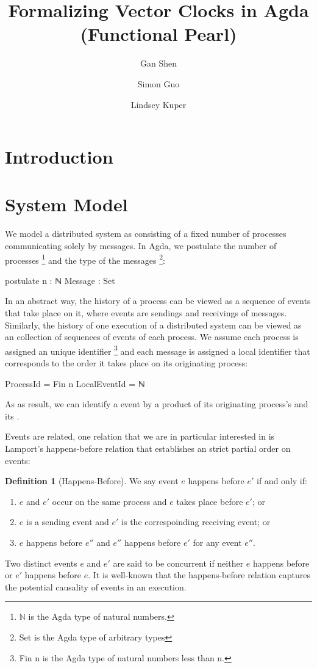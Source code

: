\documentclass[acmsmall,review,anonymous]{acmart}
\title{Formalizing Vector Clocks in Agda (Functional Pearl)}
\author{Gan Shen}
\affiliation{\institution{University of California, Santa Cruz} \country{USA}}
\author{Simon Guo}
\affiliation{\institution{University of California, Santa Cruz} \country{USA}}
\author{Lindsey Kuper}
\affiliation{\institution{University of California, Santa Cruz} \country{USA}}
\theoremstyle{definition}
\newtheorem{definition}{Definition}
\begin{document}
\maketitle

\section{Introduction}

\section{System Model}
We model a distributed system as consisting of a fixed number of
processes communicating solely by messages. In Agda, we postulate the
number of processes \footnote{\ensuremath{\mathbb{N}} is
the Agda type of natural numbers.} and the type of the messages
\footnote{Set is the Agda type of arbitrary types}:
\begin{code}
postulate
  n : ℕ
  Message : Set
\end{code}
In an abstract way, the history of a process can be viewed as a
sequence of events that take place on it, where events are sendings
and receivings of messages. Similarly, the history of one execution of
a distributed system can be viewed as an collection of sequences of
events of each process. We assume each process is assigned an unique
identifier \footnote{Fin n is the Agda type of
natural numbers less than n.} and each message is assigned a local
identifier  that corresponds to the order it
takes place on its originating process:
\begin{code}
ProcessId = Fin n
LocalEventId = ℕ
\end{code}
\noindent As as result, we can identify
a event by a product of its originating process's 
and its .

Events are related, one relation that we are in particular interested
in is Lamport's happens-before relation that establishes an strict
partial order on events:
\begin{definition}[Happens-Before]
  We say event $e$ happens before $e'$ if and only if:
  \begin{enumerate}
  \item $e$ and $e'$ occur on the same process and $e$ takes place before $e'$; or
  \item $e$ is a sending event and $e'$ is the correspoinding receiving event; or
  \item $e$ happens before $e''$ and $e''$ happens before $e'$ for any event $e''$.
  \end{enumerate}
\end{definition}
\noindent Two distinct events $e$ and $e'$ are said to be concurrent
if neither $e$ happens before or $e'$ happens before $e$.  It is
well-known that the happens-before relation captures the potential
causality of events in an execution.
\end{document}
